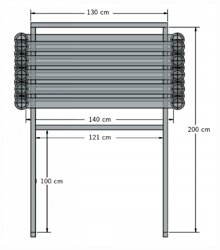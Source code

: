 \begin{figure}[h]
  \begin{minipage}[t]{.5\linewidth}
    \includegraphics[width=\linewidth]{files/figures/hptpc_dtof_characterisation/dstofFront}
  \end{minipage}
  \hfill
  \begin{minipage}[t]{.4\linewidth}

\end{minipage}
\end{figure}
